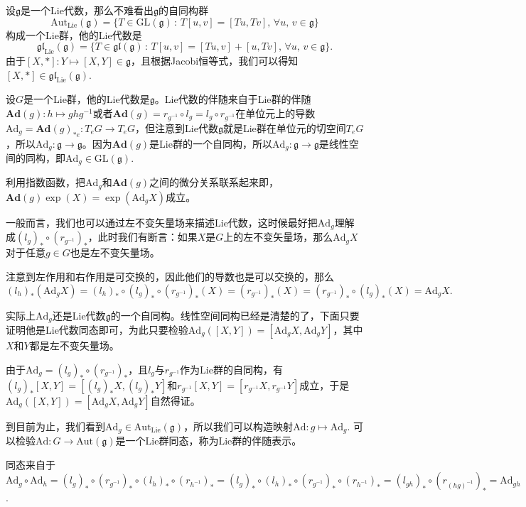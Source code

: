 \documentclass[9pt]{extarticle}
\newcommand{\lag}{{\mathfrak{g}}}
\begin{document}
\para 设$\lag$是一个Lie代数，那么不难看出$\lag$的自同构群
\[\mathrm{Aut}_{\mathrm{Lie}}(\lag)=\{T\in \mathrm{GL}(\lag)\,:\,T[u,v]=[Tu,Tv],\,\forall u,\,v\in\lag\}\]
构成一个Lie群，他的Lie代数是
\[\mathfrak{gl}_{\mathrm{Lie}}(\lag)=\{T\in \mathfrak{gl}(\lag)\,:\,T[u,v]=[Tu,v]+[u,Tv],\,\forall u,\,v\in\lag\}.\]
由于$[X,*]:Y\mapsto [X,Y]\in \lag$，且根据Jacobi恒等式，我们可以得知$[X,*]\in \mathfrak{gl}_{\mathrm{Lie}}(\lag)$.

\para 设$G$是一个Lie群，他的Lie代数是$\lag$。Lie代数的伴随来自于Lie群的伴随$\mathbf{Ad}(g):h\mapsto ghg^{-1}$或者$\mathbf{Ad}(g)=r_{g^{-1}}\circ l_g=l_g\circ r_{g^{-1}}$在单位元上的导数$\mathrm{Ad}_g=\mathbf{Ad}(g)_{*e}:T_eG\to T_eG$，但注意到Lie代数$\lag$就是Lie群在单位元的切空间$T_eG$，所以$\mathrm{Ad}_g:\lag\to \lag$。因为$\mathbf{Ad}(g)$是Lie群的一个自同构，所以$\mathrm{Ad}_g:\lag\to\lag$是线性空间的同构，即$\mathrm{Ad}_g\in \mathrm{GL}(\lag)$.

利用指数函数，把$\mathrm{Ad}_g$和$\mathbf{Ad}(g)$之间的微分关系联系起来即，$\mathbf{Ad}(g)\exp(X)=\exp(\mathrm{Ad}_gX)$成立。

\para 一般而言，我们也可以通过左不变矢量场来描述Lie代数，这时候最好把$\mathrm{Ad}_g$理解成$(l_g)_*\circ (r_{g^{-1}})_*$，此时我们有断言：如果$X$是$G$上的左不变矢量场，那么$\mathrm{Ad}_gX$对于任意$g\in G$也是左不变矢量场。

注意到左作用和右作用是可交换的，因此他们的导数也是可以交换的，那么
\[
	(l_h)_*(\mathrm{Ad}_gX)=(l_h)_*\circ (l_g)_*\circ (r_{g^{-1}})_*(X)=(r_{g^{-1}})_*(X)=(r_{g^{-1}})_*\circ (l_g)_*(X)=\mathrm{Ad}_gX.
\]

\para 实际上$\mathrm{Ad}_g$还是Lie代数$\lag$的一个自同构。线性空间同构已经是清楚的了，下面只要证明他是Lie代数同态即可，为此只要检验$\mathrm{Ad}_g([X,Y])=[\mathrm{Ad}_gX,\mathrm{Ad}_gY]$，其中$X$和$Y$都是左不变矢量场。

由于$\mathrm{Ad}_g=(l_g)_*\circ (r_{g^{-1}})_*$，且$l_g$与$r_{g^{-1}}$作为Lie群的自同构，有$(l_g)_*[X,Y]=[(l_g)_*X,(l_g)_*Y]$和$r_{g^{-1}}[X,Y]=[r_{g^{-1}}X,r_{g^{-1}}Y]$成立，于是$\mathrm{Ad}_g([X,Y])=[\mathrm{Ad}_gX,\mathrm{Ad}_gY]$自然得证。

\para 到目前为止，我们看到$\mathrm{Ad}_g\in \mathrm{Aut}_{\mathrm{Lie}}(\lag)$，所以我们可以构造映射$\mathrm{Ad}:g\mapsto \mathrm{Ad}_g$. 可以检验$\mathrm{Ad}:G\to \mathrm{Aut}(\lag)$是一个Lie群同态，称为Lie群的伴随表示。

同态来自于$\mathrm{Ad}_g\circ \mathrm{Ad}_h=(l_g)_*\circ (r_{g^{-1}})_*\circ (l_h)_*\circ (r_{h^{-1}})_*=(l_g)_*\circ (l_h)_*\circ (r_{g^{-1}})_*\circ (r_{h^{-1}})_*=(l_{gh})_*\circ (r_{(hg)^{-1}})_*=\mathrm{Ad}_{gh}$.
\end{document}

